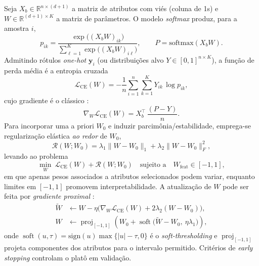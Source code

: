 \documentclass[12pt,a4paper]{report}
\begin{document}
Seja $X_b\in\mathbb{R}^{n\times(d+1)}$ a matriz de atributos com viés (coluna de 1s) e $W\in\mathbb{R}^{(d+1)\times K}$ a matriz de parâmetros. O modelo \emph{softmax} produz, para a amostra $i$,
\begin{equation}
p_{ik} = \frac{\exp\big((X_b W)_{ik}\big)}{\sum_{\ell=1}^K \exp\big((X_b W)_{i\ell}\big)},\qquad
P=\mathrm{softmax}(X_b W).
\end{equation}
Admitindo rótulos \emph{one-hot} $\mathbf{y}_i$ (ou distribuições alvo $Y\in[0,1]^{n\times K}$), a função de perda média é a entropia cruzada
\begin{equation}
\mathcal{L}_{\mathrm{CE}}(W) = -\frac{1}{n}\sum_{i=1}^n \sum_{k=1}^K Y_{ik}\,\log p_{ik},
\end{equation}
cujo gradiente é o clássico \cite{Bishop2006PRML}:
\begin{equation}
\nabla_W \mathcal{L}_{\mathrm{CE}}(W) = X_b^\top\,\frac{(P-Y)}{n}. \label{eq:grad-ce}
\end{equation}
Para incorporar uma a priori $W_0$ e induzir parcimônia/estabilidade, emprega-se regularização elástica \emph{ao redor} de $W_0$,
\begin{equation}
\mathcal{R}(W;W_0)=\lambda_1\|W-W_0\|_1 + \lambda_2\|W-W_0\|_F^2,
\end{equation}
levando ao problema
\begin{equation}
\min_{W}\ \mathcal{L}_{\mathrm{CE}}(W)+\mathcal{R}(W;W_0)
\quad\text{sujeito a}\quad W_{\text{feat}}\in[-1,1],
\end{equation}
em que apenas pesos associados a atributos selecionados podem variar, enquanto limites em $[-1,1]$ promovem interpretabilidade. A atualização de $W$ pode ser feita por \emph{gradiente proximal} \cite{Parikh2014Proximal}:
\begin{align}
\widetilde{W} &\leftarrow W - \eta\Big(\nabla_W \mathcal{L}_{\mathrm{CE}}(W) + 2\lambda_2(W-W_0)\Big),\\
W &\leftarrow \operatorname{proj}_{[-1,1]}\!\left(W_0 + \operatorname{soft}\big(\widetilde{W}-W_0,\ \eta\lambda_1\big)\right),
\end{align}
onde $\operatorname{soft}(u,\tau)=\mathrm{sign}(u)\max\{|u|-\tau,0\}$ é o \emph{soft-thresholding} e $\operatorname{proj}_{[-1,1]}$ projeta componentes dos atributos para o intervalo permitido. Critérios de \emph{early stopping} \cite{Prechelt1998EarlyStopping} controlam o platô em validação.
\end{document}
